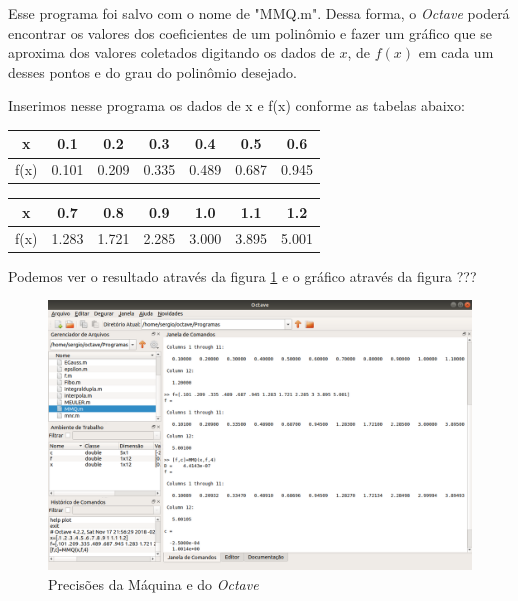 \documentclass[11pt, openright, a4paper, brazil, openany, oneside]{abntex2}
\begin{document}
Esse programa foi salvo com o nome de "MMQ.m". Dessa forma, o \textit{Octave} poderá encontrar os valores dos coeficientes de um polinômio e fazer um gráfico que se aproxima dos valores coletados digitando os dados de $x$, de $f(x)$ em cada um desses pontos e do grau do polinômio desejado.

Inserimos nesse programa os dados de x e f(x) conforme as tabelas abaixo:

\begin{center}
\begin{tabular}{c||c|c|c|c|c|c}

x & 0.1 & 0.2 & 0.3 & 0.4 & 0.5 & 0.6 \\ \hline\hline
f(x)&0.101&0.209&0.335&0.489&0.687&0.945\\ \hline\hline\hline

\end{tabular}

\begin{tabular}{c||c|c|c|c|c|c}

x & 0.7 & 0.8 & 0.9 & 1.0 & 1.1 & 1.2 \\ \hline\hline
f(x) &1.283&1.721&2.285&3.000&3.895&5.001
\end{tabular}
\end{center}

Podemos ver o resultado através da figura \ref{octave1} e o gráfico através da figura ???

\begin{figure}[h]

    \center

    \includegraphics[width=12cm]{octave1.png}
    \caption{Precisões da Máquina e do \textit{Octave} \label{octave1}}
    
\end{figure}
\end{document}
